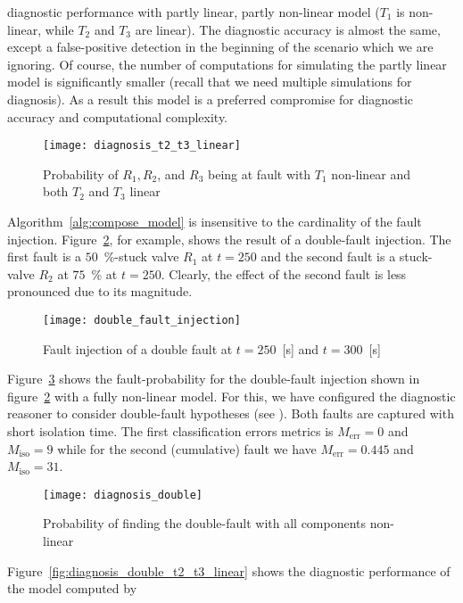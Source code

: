 diagnostic performance with partly linear, partly non-linear model
($T_1$ is non-linear, while $T_2$ and $T_3$ are linear). The
diagnostic accuracy is almost the same, except a false-positive
detection in the beginning of the scenario which we are ignoring. Of
course, the number of computations for simulating the partly linear
model is significantly smaller (recall that we need multiple
simulations for diagnosis). As a result this model is a preferred
compromise for diagnostic accuracy and computational complexity.
%
\begin{figure}[htb]
  \centering
  \texttt{[image: diagnosis\_t2\_t3\_linear]}
  \caption{Probability of $R_1, R_2$, and $R_3$ being at fault with $T_1$ non-linear and both $T_2$ and $T_3$ linear}
  \label{fig:diagnosis_t2_t3_linear}
\end{figure}
\par
%
Algorithm~\ref{alg:compose_model} is insensitive to the cardinality of
the fault injection. Figure~\ref{fig:double_fault_injection}, for
example, shows the result of a double-fault injection. The first fault
is a $50$~\%-stuck valve $R_1$ at $t = 250$ and the second fault is a
stuck-valve $R_2$ at $75$~\% at $t = 250$. Clearly, the effect of the
second fault is less pronounced due to its magnitude.
%
\begin{figure}[htb]
  \centering
  \texttt{[image: double\_fault\_injection]}
  \caption{Fault injection of a double fault at $t = 250$~[s] and $t = 300$~[s]}
  \label{fig:double_fault_injection}
\end{figure}
\par
Figure~\ref{fig:diagnosis_double} shows the fault-probability for the
double-fault injection shown in
figure~\ref{fig:double_fault_injection} with a fully non-linear
model. For this, we have configured the diagnostic reasoner to
consider double-fault hypotheses (see \cite{feldman13genius}). Both
faults are captured with short isolation time. The first
classification errors metrics is $M_{\mathrm{err}} = 0$ and
$M_{\mathrm{iso}} = 9$ while for the second (cumulative) fault we have
$M_{\mathrm{err}} = 0.445$ and $M_{\mathrm{iso}} = 31$.
%
\begin{figure}[htb]
  \centering
  \texttt{[image: diagnosis\_double]}
  \caption{Probability of finding the double-fault with all components non-linear}
  \label{fig:diagnosis_double}
\end{figure}
\par
Figure~\ref{fig:diagnosis_double_t2_t3_linear} shows the diagnostic
performance of the model computed by
